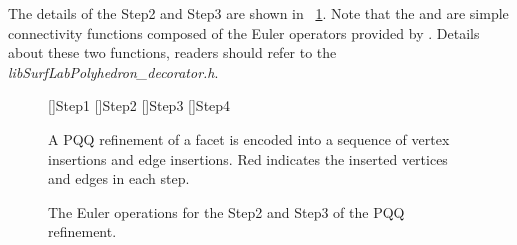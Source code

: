 The details of the Step2 and Step3 are shown in 
\figurename\ \ref{fig:CCRefinementStep23}. Note that the
 and  are simple
connectivity functions composed of the Euler operators provided 
by \cgalpoly . Details about these two functions, readers should refer
to the \emph{lib\/SurfLab\/Polyhedron\_decorator.h}.
\\

\begin{figure}
  \centering 
  []{Step1}
  []{Step2}
  []{Step3}
  []{Step4}
  \caption{A PQQ refinement of a facet is encoded into a sequence of
  vertex insertions and edge insertions. Red indicates the inserted
  vertices and edges in each step.}
  \label{fig:CCRefinement}
  \vspace{0.6cm}
  \caption{The Euler operations for the Step2 and Step3 of 
  the PQQ refinement.}
  \label{fig:CCRefinementStep23}
\end{figure}

